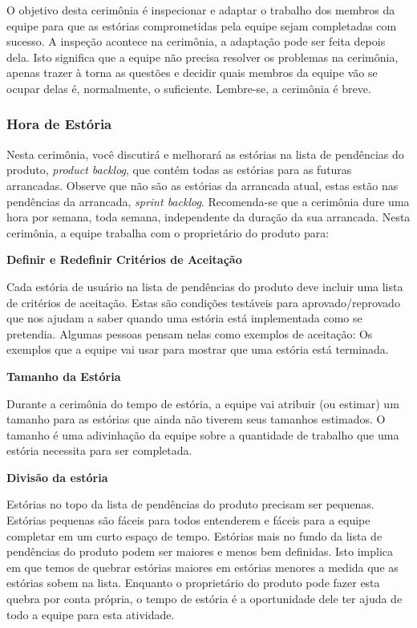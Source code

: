 \documentclass[
	11pt,				%
	openright,
	twoside,			%
	a4paper,			%
	english,			%
	french,
	brazil,				%
	sumario=tradicional
	]{abntex2}
\begin{document}
O objetivo desta cerimônia é inspecionar e adaptar o trabalho dos membros da equipe para que as estórias comprometidas pela equipe sejam completadas com sucesso. A inspeção acontece na cerimônia, a adaptação pode ser feita depois dela. Isto significa que a equipe não precisa resolver os problemas na cerimônia, apenas trazer à torna as questões e decidir quais membros da equipe vão se ocupar delas é, normalmente, o suficiente. Lembre-se, a cerimônia é breve.

\subsubsection{Hora de Estória}

Nesta cerimônia, você discutirá e melhorará as estórias na lista de pendências do produto, \emph{product backlog}, que contém todas as estórias para as futuras arrancadas. Observe que não são as estórias da arrancada atual, estas estão nas pendências da arrancada, \emph{sprint backlog}. Recomenda-se que a cerimônia dure uma hora por semana, toda semana, independente da duração da sua arrancada. Nesta cerimônia, a equipe trabalha com o proprietário do produto para:

\noindent \textbf{\small Definir e Redefinir Critérios de Aceitação}

Cada estória de usuário na lista de pendências do produto deve incluir uma lista de critérios de aceitação. Estas são condições testáveis para aprovado/reprovado que nos ajudam a saber quando uma estória está implementada como se pretendia. Algumas pessoas pensam nelas como exemplos de aceitação: Os exemplos que a equipe vai usar para mostrar que uma estória está terminada.

\noindent \textbf{\small Tamanho da Estória}

Durante a cerimônia do tempo de estória, a equipe vai atribuir (ou estimar) um tamanho para as estórias que ainda não tiverem seus tamanhos estimados. O tamanho é uma adivinhação da equipe sobre a quantidade de trabalho que uma estória necessita para ser completada.

\noindent \textbf{\small Divisão da estória}

Estórias no topo da lista de pendências do produto precisam ser pequenas. Estórias pequenas são fáceis para todos entenderem e fáceis para a equipe completar em um curto espaço de tempo. Estórias mais no fundo da lista de pendências do produto podem ser maiores e menos bem definidas. Isto implica em que temos de quebrar estórias maiores em estórias menores a medida que as estórias sobem na lista. Enquanto o proprietário do produto pode fazer esta quebra por conta própria, o tempo de estória é a oportunidade dele ter ajuda de todo a equipe para esta atividade.
\end{document}
